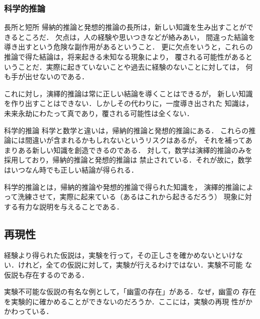             \subsubsection{科学的推論}
            \begin{mysmallsec}{長所と短所}
            帰納的推論と発想的推論の長所は，新しい知識を生み出すことができるところだ．
            欠点は，人の経験や思いつきなどが絡みあい，
            間違った結論を導き出すという危険な副作用があるということ．
            更に欠点をいうと，これらの推論で得た結論は，将来起きる未知なる現象により，
            覆される可能性があるということだ．実際に起きていないことや過去に経験のないことに対しては，
            何も手が出せないのである．

            これに対し，演繹的推論は常に正しい結論を導くことはできるが，
            新しい知識を作り出すことはできない．しかしその代わりに，一度導き出された
            知識は，未来永劫にわたって真であり，覆される可能性は全くない．
            \end{mysmallsec}

            \begin{mysmallsec}{科学的推論}
            科学と数学と違いは，帰納的推論と発想的推論にある．
            これらの推論には間違いが含まれるかもしれないというリスクはあるが，
            それを補ってあまりある新しい知識を創造できるのである．
            対して，数学は演繹的推論のみを採用しており，帰納的推論と発想的推論は
            禁止されている．それが故に，数学はいつなん時でも正しい結論が得られる．

            科学的推論とは，帰納的推論や発想的推論で得られた知識を，
            演繹的推論によって洗練させて，実際に起来ている（あるはこれから起きるだろう）
            現象に対する有力な説明を与えることである．
            \end{mysmallsec}

        \subsection{再現性}
            経験より得られた仮説は，実験を行って，その正しさを確かめないといけな
            い．けれど，全ての仮説に対して，実験が行えるわけではない．実験不可能
            な仮説も存在するのである．

            実験不可能な仮説の有名な例として，「幽霊の存在」がある．なぜ，幽霊の
            存在を実験的に確かめることができないのだろうか．ここには，実験の再現
            性がかかわっている．

